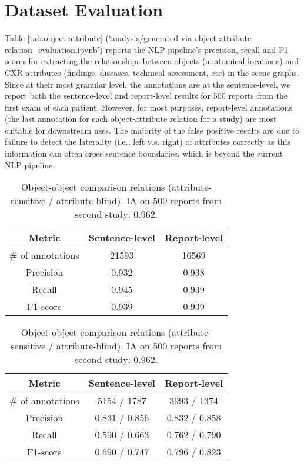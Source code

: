 \section*{Dataset Evaluation}



Table \ref{tab:object-attribute} (`analysis/generated via object-attribute-relation\_evaluation.ipynb')
reports the NLP pipeline's precision, recall and F1 scores for extracting the relationships between objects (anatomical locations) and CXR attributes (findings, diseases, technical assessment, etc) in the scene graphs. Since at their most granular level, the annotations are at the sentence-level, we report both the sentence-level and report-level results for 500 reports from the first exam of each patient. However, for most purposes, report-level annotations (the last annotation for each object-attribute relation for a study) are most suitable for downstream uses. The majority of the false positive results are due to failure to detect the laterality (i.e., left v.s. right) of attributes correctly as this information can often cross sentence boundaries, which is beyond the current NLP pipeline.

\begin{table}[t!]
\parbox{.45\linewidth}{
\centering
\footnotesize{
    \begin{tabular}{ccc}
    \hline
    Metric&Sentence-level&Report-level\\
    \hline
    \# of annotations&21593&16569\\
    Precision&0.932&0.938\\
    Recall&0.945&0.939\\
    F1-score&0.939&0.939\\
    \hline
    \end{tabular}
\caption{\label{tab:object-attribute} Object-attribute relations. Estimated inter-annotator (IA) agreement on 500 reports from first study: 0.984.}
}
}
\hspace{15pt}
\parbox{.45\linewidth}{
\centering
\footnotesize{
    \begin{tabular}{ccc}
    \hline
    Metric&Sentence-level&Report-level\\
    \hline
    \# of annotations&5154 / 1787&3993 / 1374\\
    Precision&0.831 / 0.856&0.832 / 0.858\\
    Recall&0.590 / 0.663&0.762 / 0.790\\
    F1-score&0.690 / 0.747&0.796 / 0.823\\
    \hline
    \end{tabular}
\caption{\label{tab:object-comparison}Object-object comparison relations (attribute-sensitive / attribute-blind).
IA on 500 reports from second study: 0.962.}
}
}
\vspace{-0.5cm}
\end{table}

